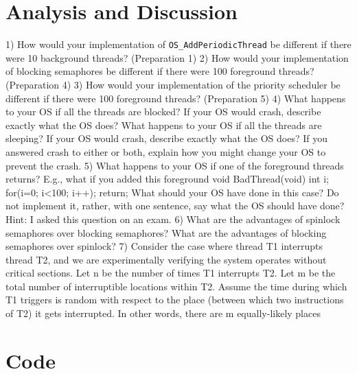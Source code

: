 \documentclass[12pt]{article}
\begin{document}
\section{Analysis and Discussion}


1) How would your implementation of \verb|OS_AddPeriodicThread| be different if there were 10 background
threads? (Preparation 1)
2) How would your implementation of blocking semaphores be different if there were 100 foreground threads?
(Preparation 4)
3) How would your implementation of the priority scheduler be different if there were 100 foreground threads?
(Preparation 5)
4) What happens to your OS if all the threads are blocked? If your OS would crash, describe exactly what the
OS does? What happens to your OS if all the threads are sleeping? If your OS would crash, describe exactly
what the OS does? If you answered crash to either or both, explain how you might change your OS to prevent
the crash.
5) What happens to your OS if one of the foreground threads returns? E.g., what if you added this foreground
void BadThread(void){ int i;
for(i=0; i<100; i++){};
return;
}
What should your OS have done in this case? Do not implement it, rather, with one sentence, say what the OS
should have done? Hint: I asked this question on an exam.
6) What are the advantages of spinlock semaphores over blocking semaphores? What are the advantages of
blocking semaphores over spinlock?
7) Consider the case where thread T1 interrupts thread T2, and we are experimentally verifying the system
operates without critical sections. Let n be the number of times T1 interrupts T2. Let m be the total number of
interruptible locations within T2. Assume the time during which T1 triggers is random with respect to the place
(between which two instructions of T2) it gets interrupted. In other words, there are m equally-likely places

\section{Code}





\end{document}
